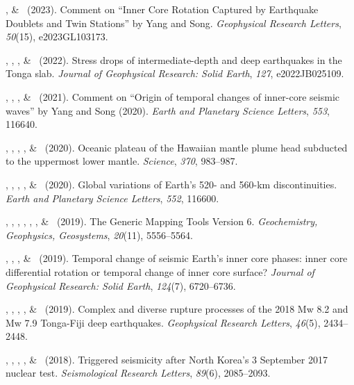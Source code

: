 \begin{etaremune}
\item \Me\CS, \& \LWen\ (2023).
    Comment on ``Inner Core Rotation Captured by Earthquake Doublets and Twin Stations'' by Yang and Song.
    \emph{Geophysical Research Letters}, \emph{50}(15), e2023GL103173.
\item \Me\CS, \SWei\CS, \WWang, \& \FWang\ (2022).
    Stress drops of intermediate-depth and deep earthquakes in the Tonga slab.
    \emph{Journal of Geophysical Research: Solid Earth}, \emph{127}, e2022JB025109.
\item \JYao\CS, \Me, \LSun, \& \LWen\ (2021).
    Comment on ``Origin of temporal changes of inner-core seismic waves'' by Yang and Song (2020).
    \emph{Earth and Planetary Science Letters}, \emph{553}, 116640.
\item \SWei\CS, \PShearer, \CLithgowBertelloni, \LStixrude, \& \Me\ (2020).
    Oceanic plateau of the Hawaiian mantle plume head subducted to the uppermost lower mantle.
    \emph{Science}, \emph{370}, 983--987.
\item \Me\CS, \MLv, \SWei, \SDorfman, \& \PShearer\ (2020).
    Global variations of Earth's 520- and 560-km discontinuities.
    \emph{Earth and Planetary Science Letters}, \emph{552}, 116600. \\
\item
    \PWessel\CS, \JLuis, \LUieda, \RScharroo, \FWobbe, \WSmith, \& \Me\ (2019).
    The Generic Mapping Tools Version 6.
    \emph{Geochemistry, Geophysics, Geosystems}, \emph{20}(11), 5556--5564.
\item
    \JYao\CS, \Me, \LSun, \& \LWen\ (2019).
    Temporal change of seismic Earth's inner core phases: inner core differential rotation or temporal change of inner core surface?
    \emph{Journal of Geophysical Research: Solid Earth}, \emph{124}(7), 6720--6736.
\item
    \WFan\CS, \SWei, \Me, \JMcGurie, \& \DWiens\ (2019).
    Complex and diverse rupture processes of the 2018 Mw 8.2 and Mw 7.9 Tonga-Fiji deep earthquakes.
    \emph{Geophysical Research Letters}, \emph{46}(5), 2434--2448.
\item
    \JYao\CF\CS, \Me\CF, \ZLu, \LSun, \& \LWen\ (2018).
    Triggered seismicity after North Korea's 3 September 2017 nuclear test.
    \emph{Seismological Research Letters}, \emph{89}(6), 2085--2093.

\end{etaremune}
